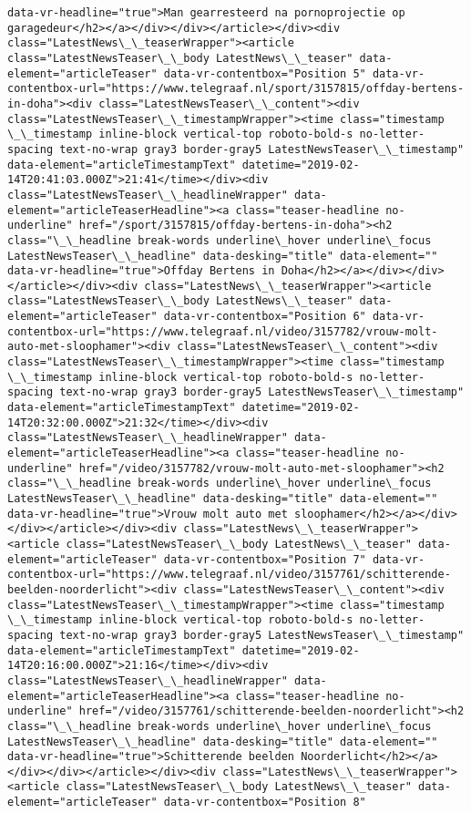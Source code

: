 \documentclass[11pt]{article}
\begin{document}
\begin{Verbatim}[commandchars=\\\{\}]
data-vr-headline="true">Man gearresteerd na pornoprojectie op garagedeur</h2></a></div></div></article></div><div class="LatestNews\_\_teaserWrapper"><article class="LatestNewsTeaser\_\_body LatestNews\_\_teaser" data-element="articleTeaser" data-vr-contentbox="Position 5" data-vr-contentbox-url="https://www.telegraaf.nl/sport/3157815/offday-bertens-in-doha"><div class="LatestNewsTeaser\_\_content"><div class="LatestNewsTeaser\_\_timestampWrapper"><time class="timestamp \_\_timestamp inline-block vertical-top roboto-bold-s no-letter-spacing text-no-wrap gray3 border-gray5 LatestNewsTeaser\_\_timestamp" data-element="articleTimestampText" datetime="2019-02-14T20:41:03.000Z">21:41</time></div><div class="LatestNewsTeaser\_\_headlineWrapper" data-element="articleTeaserHeadline"><a class="teaser-headline no-underline" href="/sport/3157815/offday-bertens-in-doha"><h2 class="\_\_headline break-words underline\_hover underline\_focus LatestNewsTeaser\_\_headline" data-desking="title" data-element="" data-vr-headline="true">Offday Bertens in Doha</h2></a></div></div></article></div><div class="LatestNews\_\_teaserWrapper"><article class="LatestNewsTeaser\_\_body LatestNews\_\_teaser" data-element="articleTeaser" data-vr-contentbox="Position 6" data-vr-contentbox-url="https://www.telegraaf.nl/video/3157782/vrouw-molt-auto-met-sloophamer"><div class="LatestNewsTeaser\_\_content"><div class="LatestNewsTeaser\_\_timestampWrapper"><time class="timestamp \_\_timestamp inline-block vertical-top roboto-bold-s no-letter-spacing text-no-wrap gray3 border-gray5 LatestNewsTeaser\_\_timestamp" data-element="articleTimestampText" datetime="2019-02-14T20:32:00.000Z">21:32</time></div><div class="LatestNewsTeaser\_\_headlineWrapper" data-element="articleTeaserHeadline"><a class="teaser-headline no-underline" href="/video/3157782/vrouw-molt-auto-met-sloophamer"><h2 class="\_\_headline break-words underline\_hover underline\_focus LatestNewsTeaser\_\_headline" data-desking="title" data-element="" data-vr-headline="true">Vrouw molt auto met sloophamer</h2></a></div></div></article></div><div class="LatestNews\_\_teaserWrapper"><article class="LatestNewsTeaser\_\_body LatestNews\_\_teaser" data-element="articleTeaser" data-vr-contentbox="Position 7" data-vr-contentbox-url="https://www.telegraaf.nl/video/3157761/schitterende-beelden-noorderlicht"><div class="LatestNewsTeaser\_\_content"><div class="LatestNewsTeaser\_\_timestampWrapper"><time class="timestamp \_\_timestamp inline-block vertical-top roboto-bold-s no-letter-spacing text-no-wrap gray3 border-gray5 LatestNewsTeaser\_\_timestamp" data-element="articleTimestampText" datetime="2019-02-14T20:16:00.000Z">21:16</time></div><div class="LatestNewsTeaser\_\_headlineWrapper" data-element="articleTeaserHeadline"><a class="teaser-headline no-underline" href="/video/3157761/schitterende-beelden-noorderlicht"><h2 class="\_\_headline break-words underline\_hover underline\_focus LatestNewsTeaser\_\_headline" data-desking="title" data-element="" data-vr-headline="true">Schitterende beelden Noorderlicht</h2></a></div></div></article></div><div class="LatestNews\_\_teaserWrapper"><article class="LatestNewsTeaser\_\_body LatestNews\_\_teaser" data-element="articleTeaser" data-vr-contentbox="Position 8" 
\end{Verbatim}
\end{document}
